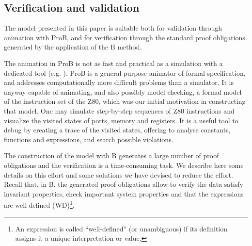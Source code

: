 \documentclass[a4paper]{llncs}
\begin{document}
%
%
%
%


\subsection{Verification and validation}


The model presented in this paper is suitable both for validation
through animation with ProB, and for verification through the standard
proof obligations generated by the application of the B method.

The animation in ProB is not as fast and practical as a simulation
with a dedicated tool (e.g. \cite{Simulator_z80}). ProB is a
general-purpose animator of formal specification, and addresses
computationally more difficult problems than a simulator. It is anyway
capable of animating, and also possibly model checking, a formal model
of the instruction set of the Z80, which was our initial motivation in
constructing that model. One may simulate step-by-step sequences of
Z80 instructions and visualize the visited states of ports, memory and
registers. It is a useful tool to debug by creating a trace of the
visited states, offering to analyse constants, functions and
expressions, and search possible violations.

The construction of the model with B generates a large number of proof
obligations and the verification is a time-consuming task. We describe
here some details on this effort and some solutions we have devised to
reduce the effort.  Recall that, in B, the generated proof obligations
allow to verify the data satisfy invariant properties, check important
system properties and that the expressions are well-defined
(WD)\footnote{An expression is called ``well-defined'' (or
  unambiguous) if its definition assigns it a unique interpretation or
  value.}.
\end{document}
